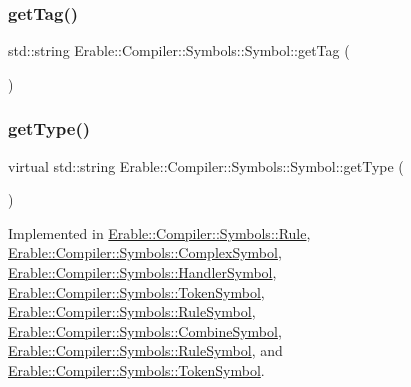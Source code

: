 \mbox{\label{class_erable_1_1_compiler_1_1_symbols_1_1_symbol_a135ecb3f3ede9d5c5804419da61716b5}} 
\subsubsection{\texorpdfstring{getTag()}{getTag()}}
{\footnotesize\ttfamily std\+::string Erable\+::\+Compiler\+::\+Symbols\+::\+Symbol\+::get\+Tag (\begin{DoxyParamCaption}{ }\end{DoxyParamCaption})\hspace{0.3cm}{\ttfamily [virtual]}}

\mbox{\label{class_erable_1_1_compiler_1_1_symbols_1_1_symbol_a63b41d0942e5d65288fa3fc9d466ab43}} 
\subsubsection{\texorpdfstring{getType()}{getType()}\hspace{0.1cm}{\footnotesize\ttfamily [1/2]}}
{\footnotesize\ttfamily virtual std\+::string Erable\+::\+Compiler\+::\+Symbols\+::\+Symbol\+::get\+Type (\begin{DoxyParamCaption}{ }\end{DoxyParamCaption})\hspace{0.3cm}{\ttfamily [pure virtual]}}



Implemented in \mbox{\hyperlink{class_erable_1_1_compiler_1_1_symbols_1_1_rule_a6e0b51b5ecaed4785480d534dc09cb8e}{Erable\+::\+Compiler\+::\+Symbols\+::\+Rule}}, \mbox{\hyperlink{class_erable_1_1_compiler_1_1_symbols_1_1_complex_symbol_a868025e3a718e2ae6226a89403859b3a}{Erable\+::\+Compiler\+::\+Symbols\+::\+Complex\+Symbol}}, \mbox{\hyperlink{class_erable_1_1_compiler_1_1_symbols_1_1_handler_symbol_a70340ea487e496cced8c05aa45968b56}{Erable\+::\+Compiler\+::\+Symbols\+::\+Handler\+Symbol}}, \mbox{\hyperlink{class_erable_1_1_compiler_1_1_symbols_1_1_token_symbol_a2cb212d21b563d12f1ac1a823e047bfe}{Erable\+::\+Compiler\+::\+Symbols\+::\+Token\+Symbol}}, \mbox{\hyperlink{class_erable_1_1_compiler_1_1_symbols_1_1_rule_symbol_af232c9c3213aad7b033b402ceb8ef388}{Erable\+::\+Compiler\+::\+Symbols\+::\+Rule\+Symbol}}, \mbox{\hyperlink{struct_erable_1_1_compiler_1_1_symbols_1_1_combine_symbol_a416d89f88e2708deeaee33425849ae4a}{Erable\+::\+Compiler\+::\+Symbols\+::\+Combine\+Symbol}}, \mbox{\hyperlink{class_erable_1_1_compiler_1_1_symbols_1_1_rule_symbol_a0497f4aa633b946b4a418d5bde3e96fd}{Erable\+::\+Compiler\+::\+Symbols\+::\+Rule\+Symbol}}, and \mbox{\hyperlink{class_erable_1_1_compiler_1_1_symbols_1_1_token_symbol_af74e0413d933d950bcf47d7ab568d20f}{Erable\+::\+Compiler\+::\+Symbols\+::\+Token\+Symbol}}.

